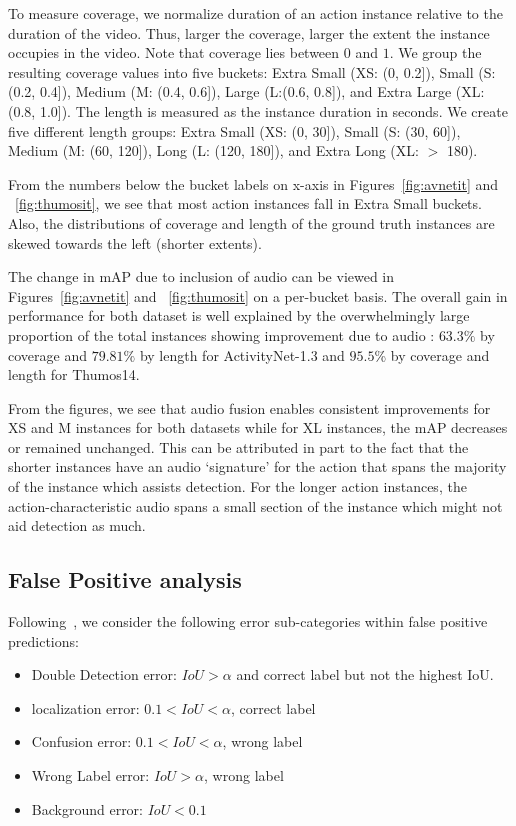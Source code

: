 \documentclass[10pt,twocolumn,letterpaper]{article}
\begin{document}
To measure coverage, we normalize duration of an action instance relative to the duration of the video. Thus, larger the coverage, larger the extent the instance occupies in the video. Note that coverage lies between $0$ and $1$. We group the resulting coverage values into five buckets: Extra Small (XS: (0, 0.2]), Small (S: (0.2, 0.4]), Medium (M: (0.4, 0.6]), Large (L:(0.6, 0.8]), and Extra Large (XL: (0.8, 1.0]). The length is measured as the instance duration in seconds. We create five different length groups: Extra Small (XS: (0, 30]), Small (S: (30, 60]), Medium (M: (60, 120]), Long (L: (120, 180]), and Extra Long (XL: $>$ 180).

From the numbers below the bucket labels on x-axis in  Figures~\ref{fig:avnetit} and ~\ref{fig:thumosit}, we see that most action instances fall in Extra Small buckets. Also, the distributions of coverage and length of the ground truth instances are skewed towards the left (shorter extents).

The change in mAP due to inclusion of audio can be viewed in Figures~\ref{fig:avnetit} and ~\ref{fig:thumosit} on a per-bucket basis. The overall gain in performance for both dataset is well explained by the overwhelmingly large proportion of the total instances showing improvement due to audio : $63.3\%$ by coverage and $79.81\%$ by length for ActivityNet-1.3 and $95.5$\% by coverage and length for Thumos14. 

From the figures, we see that audio fusion enables consistent improvements for XS and M instances for both datasets while for XL instances, the mAP decreases or remained unchanged. This can be attributed in part to the fact that the shorter instances have an audio `signature' for the action that spans the majority of the instance which assists detection. For the longer action instances, the action-characteristic audio spans a small section of the instance which might not aid detection as much. 



\subsection{False Positive analysis} 

Following~\cite{alwassel_2018_detad}, we consider the following error sub-categories within false positive predictions:
\begin{itemize}
    \item Double Detection error: $IoU > \alpha$ and correct label but not the highest IoU.
    \item localization error: $0.1 < IoU < \alpha$, correct label
    \item Confusion error: $0.1 < IoU < \alpha$, wrong label
    \item Wrong Label error: $IoU > \alpha$, wrong label
    \item Background error: $IoU < 0.1$ 
\end{itemize}
\end{document}
